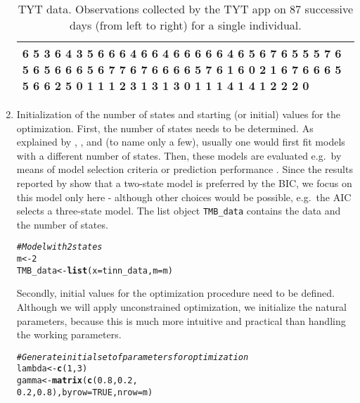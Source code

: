 \documentclass[bimj,fleqn]{w-art}\usepackage[]{graphicx}\usepackage[]{color}
\makeatletter
\newcommand{\hlnum}[1]{\textcolor[rgb]{0.686,0.059,0.569}{#1}}%
\newcommand{\hlcom}[1]{\textcolor[rgb]{0.678,0.584,0.686}{\textit{#1}}}%
\newcommand{\hlstd}[1]{\textcolor[rgb]{0.345,0.345,0.345}{#1}}%
\newcommand{\hlkwb}[1]{\textcolor[rgb]{0.69,0.353,0.396}{#1}}%
\newcommand{\hlkwc}[1]{\textcolor[rgb]{0.333,0.667,0.333}{#1}}%
\newcommand{\hlkwd}[1]{\textcolor[rgb]{0.737,0.353,0.396}{\textbf{#1}}}%
\newenvironment{kframe}{%
 \def\at@end@of@kframe{}%
 \ifinner\ifhmode%
  \def\at@end@of@kframe{\end{minipage}}%
  \begin{minipage}{\columnwidth}%
 \fi\fi%
 \def\FrameCommand##1{\hskip\@totalleftmargin \hskip-\fboxsep
 \colorbox{shadecolor}{##1}\hskip-\fboxsep
     \hskip-\linewidth \hskip-\@totalleftmargin \hskip\columnwidth}%
 \MakeFramed {\advance\hsize-\width
   \@totalleftmargin\z@ \linewidth\hsize
   \@setminipage}}%
 {\par\unskip\endMakeFramed%
 \at@end@of@kframe}
\newenvironment{knitrout}{}{} %
\theoremstyle{plain}
\theoremstyle{definition}
\makeatother
\begin{document}
\begin{enumerate}
\begin{table}[ht]
\centering
\begin{tabular}{p{15cm}}
   \hline
6 5 3 6 4 3 5 6 6 6 4 6 6 4 6 6 6 6 6 4 6 5 6 7 6 5 5 5 7 6 5 6 5 6 6 6 5 6 7 7 6 7 6 6 6 6 5 7 6 1 6 0 2 1 6 7 6 6 6 5 5 6 6 2 5 0 1 1 1 2 3 1 3 1 3 0 1 1 1 4 1 4 1 2 2 2 0 \\ 
   \hline
\end{tabular}
\caption{TYT data. Observations collected by the TYT app on 87 successive days (from left to right) for a single individual.} 
\label{table:tinnitus_data}
\end{table}



\item Initialization of the number of states and starting (or initial) values for the optimization. First, the number of states needs to be determined. As explained by \citet{pohlea}, \citet{pohle}, and \citet[][Section 6]{zucchini} (to name only a few), usually one would first fit models with a different number of states. Then, these models are evaluated e.g.~by means of model selection criteria \citep[as carried out by][]{leroux} or prediction performance \citep{celeux}. Since the results reported by \citet{leroux} show that a two-state model is preferred by the BIC, we focus on this model only here - although other choices would be possible, e.g.~the AIC selects a three-state model. The list object \texttt{TMB\_data} contains the data and the number of states.
\begin{knitrout}
\color{fgcolor}\begin{kframe}
\begin{alltt}
\hlcom{# Model with 2 states}
\hlstd{m} \hlkwb{<-} \hlnum{2}
\hlstd{TMB_data} \hlkwb{<-} \hlkwd{list}\hlstd{(}\hlkwc{x} \hlstd{= tinn_data,} \hlkwc{m} \hlstd{= m)}
\end{alltt}
\end{kframe}
\end{knitrout}
Secondly, initial values for the optimization procedure need to be defined. Although we will apply unconstrained optimization, we initialize the natural parameters, because this is much more intuitive and practical than handling the working parameters. 
\begin{knitrout}
\color{fgcolor}\begin{kframe}
\begin{alltt}
\hlcom{# Generate initial set of parameters for optimization}
\hlstd{lambda} \hlkwb{<-} \hlkwd{c}\hlstd{(}\hlnum{1}\hlstd{,} \hlnum{3}\hlstd{)}
\hlstd{gamma} \hlkwb{<-} \hlkwd{matrix}\hlstd{(}\hlkwd{c}\hlstd{(}\hlnum{0.8}\hlstd{,} \hlnum{0.2}\hlstd{,}
                  \hlnum{0.2}\hlstd{,} \hlnum{0.8}\hlstd{),} \hlkwc{byrow} \hlstd{=} \hlnum{TRUE}\hlstd{,} \hlkwc{nrow} \hlstd{= m)}
\end{alltt}
\end{kframe}
\end{knitrout}


\end{enumerate}
\end{document}

